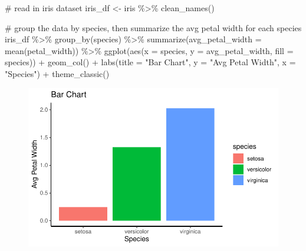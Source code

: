 \documentclass[
  letterpaper,
  DIV=11,
  numbers=noendperiod]{scrreprt}
\newenvironment{Shaded}{\begin{snugshade}}{\end{snugshade}}
\newcommand{\AttributeTok}[1]{\textcolor[rgb]{0.40,0.45,0.13}{#1}}
\newcommand{\CommentTok}[1]{\textcolor[rgb]{0.37,0.37,0.37}{#1}}
\newcommand{\FunctionTok}[1]{\textcolor[rgb]{0.28,0.35,0.67}{#1}}
\newcommand{\NormalTok}[1]{\textcolor[rgb]{0.00,0.23,0.31}{#1}}
\newcommand{\OtherTok}[1]{\textcolor[rgb]{0.00,0.23,0.31}{#1}}
\newcommand{\SpecialCharTok}[1]{\textcolor[rgb]{0.37,0.37,0.37}{#1}}
\newcommand{\StringTok}[1]{\textcolor[rgb]{0.13,0.47,0.30}{#1}}
\begin{document}
\begin{Shaded}
\begin{Highlighting}[]
\CommentTok{\# read in iris dataset }
\NormalTok{iris\_df }\OtherTok{\textless{}{-}}\NormalTok{ iris }\SpecialCharTok{\%\textgreater{}\%}
  \FunctionTok{clean\_names}\NormalTok{()}

\CommentTok{\# group the data by species, then summarize the avg petal width for each species}
\NormalTok{iris\_df }\SpecialCharTok{\%\textgreater{}\%} 
  \FunctionTok{group\_by}\NormalTok{(species) }\SpecialCharTok{\%\textgreater{}\%}
  \FunctionTok{summarize}\NormalTok{(}\AttributeTok{avg\_petal\_width =} \FunctionTok{mean}\NormalTok{(petal\_width)) }\SpecialCharTok{\%\textgreater{}\%}
  \FunctionTok{ggplot}\NormalTok{(}\FunctionTok{aes}\NormalTok{(}\AttributeTok{x =}\NormalTok{ species, }\AttributeTok{y =}\NormalTok{ avg\_petal\_width, }\AttributeTok{fill =}\NormalTok{ species)) }\SpecialCharTok{+}
  \FunctionTok{geom\_col}\NormalTok{() }\SpecialCharTok{+}
  \FunctionTok{labs}\NormalTok{(}\AttributeTok{title =} \StringTok{"Bar Chart"}\NormalTok{, }\AttributeTok{y =} \StringTok{"Avg Petal Width"}\NormalTok{, }\AttributeTok{x =} \StringTok{"Species"}\NormalTok{) }\SpecialCharTok{+}
  \FunctionTok{theme\_classic}\NormalTok{()}
\end{Highlighting}
\end{Shaded}

\begin{figure}[H]

{\centering \includegraphics{./visualizing-data_files/figure-pdf/unnamed-chunk-8-1.pdf}

}

\end{figure}
\end{document}
